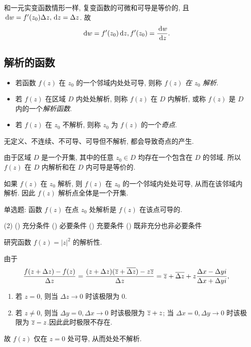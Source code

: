 和一元实变函数情形一样, 复变函数的可微和可导是等价的, 且 $\,\mathrm{d} w=f'(z_0)\Delta z, \,\mathrm{d} z=\Delta z$.
故
  \[\,\mathrm{d} w=f'(z_0)\,\mathrm{d} z, f'(z_0)=\dfrac{\,\mathrm{d} w}{\,\mathrm{d} z}.\]


\subsection{解析的函数}

\begin{definition}[解析和奇点]
	\begin{itemize}
		\item 若函数 $f(z)$ 在 $z_0$ 的一个邻域内处处可导, 则称 \emph{$f(z)$ 在 $z_0$ 解析}.
		\item 若 $f(z)$ 在区域 $D$ 内处处解析, 则称 $f(z)$ 在 $D$ 内解析, 或称 $f(z)$ 是 $D$ 内的一个\emph{解析函数}.
		\item 若 $f(z)$ 在 $z_0$ 不解析, 则称 $z_0$ 为 $f(z)$ 的一个\emph{奇点}.
	\end{itemize}
\end{definition}

无定义、不连续、不可导、可导但不解析, 都会导致奇点的产生.

由于区域 $D$ 是一个开集, 其中的任意 $z_0\in D$ 均存在一个包含在 $D$ 的邻域. 所以 \alert{$f(z)$ 在 $D$ 内解析和在 $D$ 内可导是等价的}.

如果 $f(z)$ 在 $z_0$ 解析, 则 $f(z)$ 在 $z_0$ 的一个邻域内处处可导, 从而在该邻域内解析. 因此 \alert{$f(z)$ 解析点全体是一个开集}.

\begin{exercise}
	单选题: 函数 $f(z)$ 在点 $z_0$ 处解析是 $f(z)$ 在该点可导的\fillbrace{}.
	\begin{taskschoice}(2)
		() 充分条件
		() 必要条件
		() 充要条件
		() 既非充分也非必要条件
	\end{taskschoice}
\end{exercise}

\begin{example}
	研究函数 $f(z)=|z|^2$ 的解析性.
\end{example}
\begin{solution}
	由于
	\[
		\frac{f(z+\Delta z)-f(z)}{\Delta z}
		=\frac{(z+\Delta z)(\overline z+\overline{\Delta z})-z\overline z}{\Delta z}
		=\overline z+\overline{\Delta z}+z\frac{\Delta x-\Delta yi}{\Delta x+\Delta yi},
	\]
  \begin{enumerate}
    \item 若 $z=0$, 则当 $\Delta z\to 0$ 时该极限为 $0$.
    \item 若 $z\neq0$, 则当 $\Delta y=0,\Delta x\to 0$ 时该极限为 $\overline z+z$; 当 $\Delta x=0,\Delta y\to 0$ 时该极限为 $\overline z-z$.因此此时极限不存在.
  \end{enumerate}
	故 $f(z)$ 仅在 $z=0$ 处可导, 从而处处不解析.
\end{solution}


